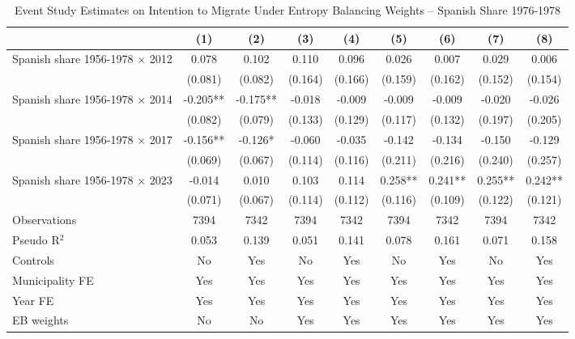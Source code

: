 \begin{table}[!h]
\centering
\renewcommand{\arraystretch}{1.25}
\setlength{\tabcolsep}{3pt}
\caption{Event Study Estimates on Intention to Migrate Under Entropy Balancing Weights -- Spanish Share 1976-1978}
\begin{tabular}{lcccccccc}
\hline
 & (1) & (2) & (3) & (4) & (5) & (6) & (7) & (8) \\
\hline
Spanish share 1956-1978 $\times$ 2012 & 0.078 & 0.102 & 0.110 & 0.096 & 0.026 & 0.007 & 0.029 & 0.006 \\
 & (0.081) & (0.082) & (0.164) & (0.166) & (0.159) & (0.162) & (0.152) & (0.154) \\
Spanish share 1956-1978 $\times$ 2014 & -0.205** & -0.175** & -0.018 & -0.009 & -0.009 & -0.009 & -0.020 & -0.026 \\
 & (0.082) & (0.079) & (0.133) & (0.129) & (0.117) & (0.132) & (0.197) & (0.205) \\
Spanish share 1956-1978 $\times$ 2017 & -0.156** & -0.126* & -0.060 & -0.035 & -0.142 & -0.134 & -0.150 & -0.129 \\
 & (0.069) & (0.067) & (0.114) & (0.116) & (0.211) & (0.216) & (0.240) & (0.257) \\
Spanish share 1956-1978 $\times$ 2023 & -0.014 & 0.010 & 0.103 & 0.114 & 0.258** & 0.241** & 0.255** & 0.242** \\
 & (0.071) & (0.067) & (0.114) & (0.112) & (0.116) & (0.109) & (0.122) & (0.121) \\
\addlinespace
Observations & 7394 & 7342 & 7394 & 7342 & 7394 & 7342 & 7394 & 7342 \\
Pseudo R$^2$ & 0.053 & 0.139 & 0.051 & 0.141 & 0.078 & 0.161 & 0.071 & 0.158 \\
Controls & No & Yes & No & Yes & No & Yes & No & Yes \\
Municipality FE & Yes & Yes & Yes & Yes & Yes & Yes & Yes & Yes \\
Year FE & Yes & Yes & Yes & Yes & Yes & Yes & Yes & Yes \\
EB weights & No & No & Yes & Yes & Yes & Yes & Yes & Yes \\
\hline
\end{tabular}
\vspace{0.4em}
\captionsetup{justification=justified, singlelinecheck=false}

\end{table}
